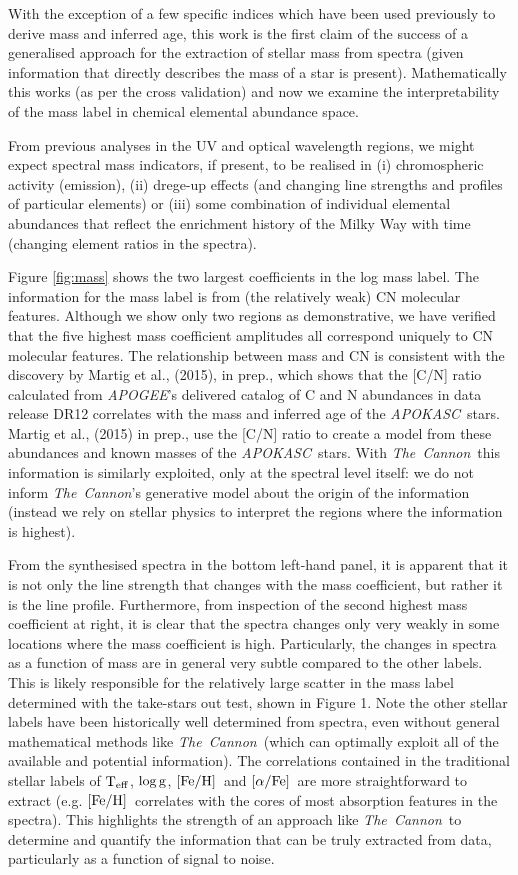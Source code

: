 \documentclass[12pt, preprint]{aastex}
\newcommand{\project}[1]{\textsl{#1}}
\newcommand{\tc}{\project{The~Cannon}}
\newcommand{\apogee}{\project{APOGEE}}
\newcommand{\apokasc}{\project{APOKASC}}
\newcommand{\teff}{\mbox{$\rm T_{eff}$}}
\newcommand{\feh}{\mbox{$\rm [Fe/H]$}}
\newcommand{\alphafe}{\mbox{$\rm [\alpha/Fe]$}}
\newcommand{\logg}{\mbox{$\rm \log g$}}
\begin{document}
With the exception of a few specific indices which have been used previously to derive mass and inferred age, this work is the first claim of the success of a generalised approach for the extraction of stellar mass from spectra (given information that directly describes the mass of a star is present).  Mathematically this works (as per the cross validation) and now we examine the interpretability of the mass label in chemical elemental abundance space. 

From previous analyses in the UV and optical wavelength regions, we might expect spectral mass indicators, if present, to be realised in (i) chromospheric activity (emission), (ii) drege-up effects (and changing line strengths and profiles of particular elements) or (iii) some combination of individual elemental abundances that reflect the enrichment history of the Milky Way with time (changing element ratios in the spectra). 

Figure \ref{fig:mass} shows the two largest coefficients in the log mass label. The information for the mass label is from (the relatively weak) CN molecular features. Although we show only two regions as demonstrative, we have verified that the five highest mass coefficient amplitudes all correspond uniquely to CN molecular features. The relationship between mass and CN is consistent with the discovery by Martig et al., (2015), in prep., which shows that the [C/N] ratio calculated from \apogee's delivered catalog of C and N abundances in data release DR12 correlates with the mass and inferred age of the \apokasc\ stars. Martig et al., (2015) in prep., use the [C/N] ratio to create a model from these abundances and known masses of the \apokasc\ stars. With \tc\, this information is similarly exploited, only at the spectral level itself: we do not inform \tc's generative model about the origin of the information (instead we rely on stellar physics to interpret the regions where the information is highest). 

From the synthesised spectra in the bottom left-hand panel, it is apparent that it is not only the line strength that changes with the mass coefficient, but rather it is the line profile. Furthermore, from inspection of the second highest mass coefficient at right, it is clear that the spectra changes only very weakly in some locations where the mass coefficient is high. Particularly, the changes in spectra as a function of mass are in general very subtle compared to the other labels. This is likely responsible for the relatively large scatter in the mass label determined with the take-stars out test, shown in Figure 1. Note the other stellar labels have been historically well determined from spectra, even without general mathematical methods like \tc\ (which can optimally exploit all of the available and potential information). The correlations contained in the traditional stellar labels of \teff, \logg, \feh\ and \alphafe\ are more straightforward to extract (e.g. \feh\ correlates with the cores of most absorption features in the spectra). This highlights the strength of an approach like \tc\ to determine and quantify the information that can be truly extracted from data, particularly as a function of signal to noise. 
\end{document}

